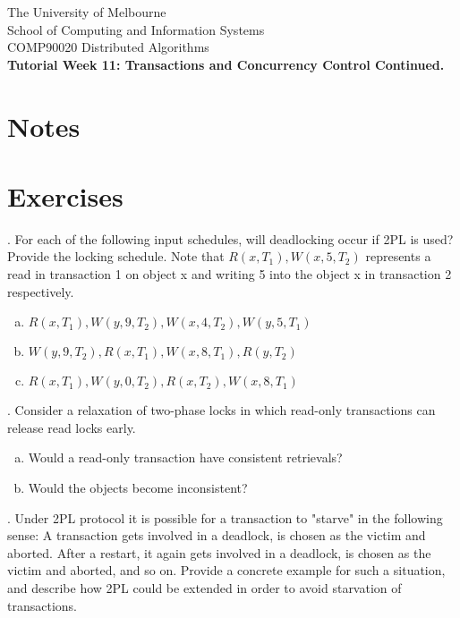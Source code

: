 \documentclass[12pt]{article}
\newcounter{question}
\newcommand{\question}[1]{
    \stepcounter{question}
    \thequestion. #1 \hfill
}
\begin{document}
\begin{center}
    {\sc The University of Melbourne
        \\
        School of Computing and Information Systems
        \\
    COMP90020 Distributed Algorithms}
    \bigskip \\
    {\Large\bf Tutorial Week 11: Transactions and Concurrency Control Continued.}
    \bigskip \\
\end{center}

\section*{Notes}


\section*{Exercises}

\setcounter{question}{45}

\question{For each of the following input schedules, will deadlocking occur if 2PL is used? Provide the locking schedule. Note that $R(x,T_1), W(x,5,T_2)$ represents a read in transaction 1 on object x and writing 5 into the object x in transaction 2 respectively.}

\begin{enumerate}[(a)]
    \item $R(x,T_1), W(y,9,T_2), W(x,4,T_2), W(y, 5, T_1)$
    \item $W(y,9,T_2), R(x,T_1), W(x,8, T_1), R(y,T_2)$
    \item $R(x,T_1),W(y,0,T_2), R(x,T_2), W(x,8, T_1)$
\end{enumerate}


\question{Consider a relaxation of two-phase locks in which read-only transactions can release read locks early.}

\begin{enumerate}[(a)]
    \item Would a read-only transaction have consistent retrievals?
    \item Would the objects become inconsistent?
\end{enumerate}

\question{Under 2PL protocol it is possible for a transaction to "starve" in the following sense: A transaction gets involved in a deadlock, is chosen as the victim and aborted. After a restart, it again gets involved in a deadlock, is chosen as the victim and aborted, and so on. Provide a concrete example for such a situation, and describe how 2PL could be extended in order to avoid starvation of transactions.}
\end{document}
